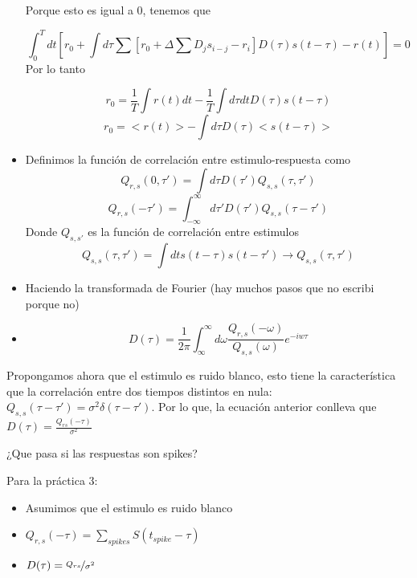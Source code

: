 \begin{itemize}
	Porque esto es igual  a 0, tenemos que

	\begin{equation}
		\int_0^T dt [r_0 +  \int d\tau \sum [r_0 + \Delta \sum D_j s_{i-j} -r_i]D(\tau) s(t-\tau) -r(t)] =0
	\end{equation}
	Por lo tanto

	\begin{equation}
		r_0 = \frac{1}{T} \int r(t)dt - \frac{1}{T} \int d\tau dt D(\tau) s(t-\tau)
	\end{equation}
	\begin{equation}
		r_0 = <r(t)> - \int d\tau D(\tau)<s(t-\tau)>
	\end{equation}
	\item Definimos la función de correlación entre estimulo-respuesta como
	\begin{equation}
		Q_{r,s} (0, \tau') = \int d\tau D(\tau') Q_{s,s}(\tau, \tau')
	\end{equation}
	\begin{equation}
			Q_{r,s} (-\tau') = \int_{-\infty}^{\infty} d\tau' D(\tau') Q_{s,s}(\tau- \tau')
	\end{equation}
	Donde $Q_{s,s'}$ es la función de correlación entre estimulos
	\begin{equation}
		Q_{s,s} (\tau, \tau') = \int dt s(t-\tau)s(t-\tau') \rightarrow Q_{s,s}(\tau, \tau')
	\end{equation}

	\item Haciendo la transformada de Fourier (hay muchos pasos que no escribi porque no) 
	\item 
	\begin{equation}
		D(\tau) = \frac{1}{2\pi} \int^{\infty}_{\infty} d\omega \frac{Q_{r,s}(-\omega)}{Q_{s,s}(\omega)} e^{-iw\tau}
	\end{equation}

\end{itemize}


Propongamos ahora que el estimulo es ruido blanco, esto tiene la característica que la correlación entre dos tiempos distintos en nula: $Q_{s,s}(\tau - \tau') =  \sigma^2 \delta(\tau-\tau')$. Por lo que, la ecuación anterior conlleva que $D(\tau) = \frac{Q_{rs}(-\tau)}{\sigma^2}$

¿Que pasa si las respuestas son spikes?  

Para la práctica 3:

\begin{itemize}
	\item Asumimos que el estimulo es ruido blanco 
	\item $Q_{r,s}(-\tau) = \sum_{spikes} S(t_{spike} - \tau)$
	\item $D(\tau)= \nicefrac{Q_{rs}}{\sigma^2}$ 
\end{itemize}



